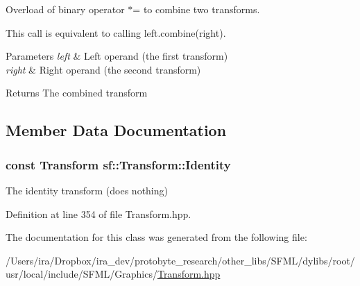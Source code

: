 Overload of binary operator $\ast$= to combine two transforms. 

This call is equivalent to calling left.\-combine(right).


\begin{DoxyParams}{Parameters}
{\em left} & Left operand (the first transform) \\
\hline
{\em right} & Right operand (the second transform)\\
\hline
\end{DoxyParams}
\begin{DoxyReturn}{Returns}
The combined transform 
\end{DoxyReturn}


\subsection{Member Data Documentation}
\hypertarget{classsf_1_1_transform_aa4eb1eecbcb9979d76e2543b337fdb13}{
\subsubsection[{Identity}]{\setlength{\rightskip}{0pt plus 5cm}const {\bf Transform} sf\-::\-Transform\-::\-Identity\hspace{0.3cm}{\ttfamily [static]}}}\label{classsf_1_1_transform_aa4eb1eecbcb9979d76e2543b337fdb13}


The identity transform (does nothing) 



Definition at line 354 of file Transform.\-hpp.



The documentation for this class was generated from the following file\-:\begin{DoxyCompactItemize}
\item 
/\-Users/ira/\-Dropbox/ira\-\_\-dev/protobyte\-\_\-research/other\-\_\-libs/\-S\-F\-M\-L/dylibs/root/usr/local/include/\-S\-F\-M\-L/\-Graphics/\hyperlink{_transform_8hpp}{Transform.\-hpp}\end{DoxyCompactItemize}
